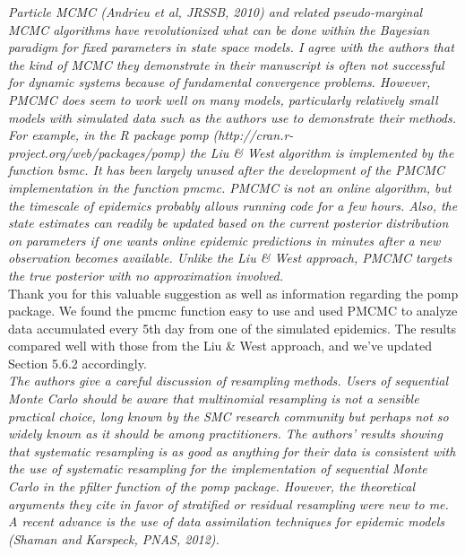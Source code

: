 \documentclass{article}
\begin{document}
\noindent \emph{Particle MCMC (Andrieu et al, JRSSB, 2010) and related pseudo-marginal MCMC algorithms have revolutionized what can be done within the Bayesian paradigm for fixed parameters in state space models. I agree with the authors that the kind of MCMC they demonstrate in their manuscript is often not successful for dynamic systems because of fundamental convergence problems. However, PMCMC does seem to work well on many models, particularly relatively small models with simulated data such as the authors use to demonstrate their methods. For example, in the R package pomp (http://cran.r-project.org/web/packages/pomp) the Liu \& West algorithm is implemented by the function bsmc. It has been largely unused after the development of the PMCMC implementation in the function pmcmc. PMCMC is not an online algorithm, but the timescale of epidemics probably allows running code for a few hours. Also, the state estimates can readily be updated based on the current posterior distribution on parameters if one wants online epidemic predictions in minutes after a new observation becomes available. Unlike the Liu \& West approach, PMCMC targets the true posterior with no approximation involved.} \\

Thank you for this valuable suggestion as well as information regarding the pomp package. We found the pmcmc function easy to use and used PMCMC to analyze data accumulated every 5th day from one of the simulated epidemics. The results compared well with those from the Liu \& West approach, and we've updated Section 5.6.2 accordingly. \\

\noindent \emph{The authors give a careful discussion of resampling methods. Users of sequential Monte Carlo should be aware that multinomial resampling is not a sensible practical choice, long known by the SMC research community but perhaps not so widely known as it should be among practitioners. The authors' results showing that systematic resampling is as good as anything for their data is consistent with the use of systematic resampling for the implementation of sequential Monte Carlo in the pfilter function of the pomp package. However, the theoretical arguments they cite in favor of stratified or residual resampling were new to me.} \\

\noindent \emph{A recent advance is the use of data assimilation techniques for epidemic models (Shaman and Karspeck, PNAS, 2012).} \\
\end{document}
